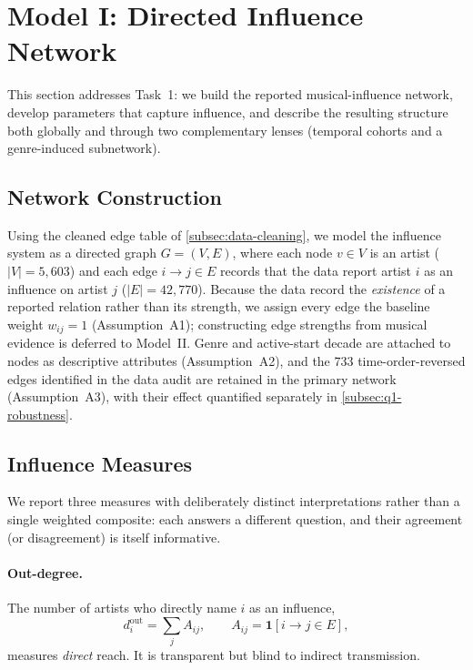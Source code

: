 \section{Model I: Directed Influence Network}\label{sec:model-influence}

This section addresses Task~1: we build the reported musical-influence network,
develop parameters that capture influence, and describe the resulting structure
both globally and through two complementary lenses (temporal cohorts and a
genre-induced subnetwork).

\subsection{Network Construction}\label{subsec:net-construction}

Using the cleaned edge table of \cref{subsec:data-cleaning}, we model the
influence system as a directed graph \(G=(V,E)\), where each node
\(v\in V\) is an artist (\(|V|=5{,}603\)) and each edge \(i\to j\in E\)
records that the data report artist \(i\) as an influence on artist \(j\)
(\(|E|=42{,}770\)). Because the data record the \emph{existence} of a
reported relation rather than its strength, we assign every edge the
baseline weight \(w_{ij}=1\) (Assumption~A1); constructing edge strengths
from musical evidence is deferred to Model~II. Genre and active-start
decade are attached to nodes as descriptive attributes (Assumption~A2),
and the 733 time-order-reversed edges identified in the data audit are
retained in the primary network (Assumption~A3), with their effect
quantified separately in \cref{subsec:q1-robustness}.

\subsection{Influence Measures}\label{subsec:q1-measures}

We report three measures with deliberately distinct interpretations rather
than a single weighted composite: each answers a different question, and their
agreement (or disagreement) is itself informative.

\paragraph{Out-degree.}
The number of artists who directly name \(i\) as an influence,
\begin{equation}
d_i^{\text{out}}=\sum_{j} A_{ij}, \qquad A_{ij}=\mathbf{1}[i\to j\in E],
\end{equation}
measures \emph{direct} reach. It is transparent but blind to indirect
transmission.

